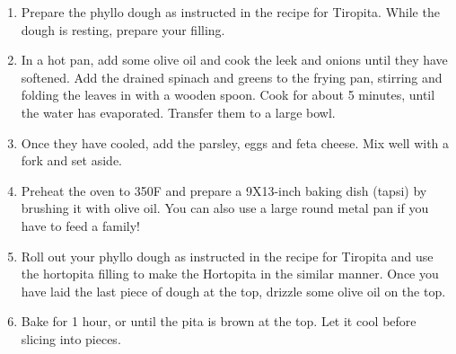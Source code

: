 \begin{enumerate}
    \item Prepare the phyllo dough as instructed in the recipe for Tiropita. While the dough is resting, prepare your filling.
    \item In a hot pan, add some olive oil and cook the leek and onions until they have softened. Add the drained spinach and greens to the frying pan, stirring and folding the leaves in with a wooden spoon. Cook for about 5 minutes, until the water has evaporated. Transfer them to a large bowl.
    \item Once they have cooled, add the parsley, eggs and feta cheese. Mix well with a fork and set aside.
    \item Preheat the oven to 350\degree F and prepare a 9X13-inch baking dish (tapsi) by brushing it with olive oil. You can also use a large round metal pan if you have to feed a family!
    \item Roll out your phyllo dough as instructed in the recipe for Tiropita and use the hortopita filling to make the Hortopita in the similar manner. Once you have laid the last piece of dough at the top, drizzle some olive oil on the top.
    \item Bake for 1 hour, or until the pita is brown at the top. Let it cool before slicing into pieces.
\end{enumerate}

